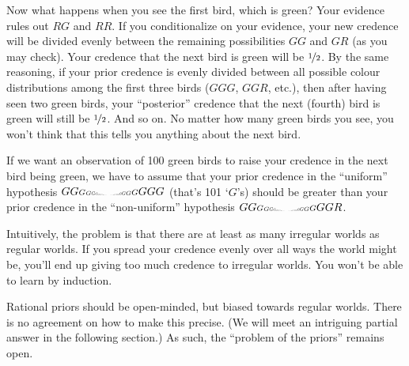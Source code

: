 Now what happens when you see the first bird, which is green? Your evidence
rules out $RG$ and $RR$. If you conditionalize on your evidence, your new
credence will be divided evenly between the remaining possibilities $GG$ and
$GR$ (as you may check). Your credence that the next bird is green will be
$\nicefrac{1}{2}$. By the same reasoning, if your prior credence is evenly
divided between all possible colour distributions among the first three birds
($GGG$, $GGR$, etc.), then after having seen two green birds, your ``posterior''
credence that the next (fourth) bird is green will still be $\nicefrac{1}{2}$. And so
on. No matter how many green birds you see, you won't think that this tells you
anything about the next bird.

If we want an observation of 100 green birds to raise your credence in the next
bird being green, we have to assume that your prior credence in the ``uniform''
hypothesis
$GG
{\scriptstyle G}
{\scriptscriptstyle G}
\scaleto{G}{3pt}
\scaleto{G}{2pt}
\scaleto{GG}{1.2pt}
\scaleto{GG}{0.8pt}
\scaleto{GG}{0.5pt}
\scaleto{GG}{0.3pt}
\scaleto{GGGGGGG}{0.2pt}
\scaleto{
  GGGGGGGGGG
  GGGGGGGGGG
  GGGGGGGGGG
}{0.1pt}
\scaleto{GGGGGGG}{0.2pt}
\scaleto{GG}{0.3pt}
\scaleto{GG}{0.5pt}
\scaleto{GG}{0.8pt}
\scaleto{GG}{1.2pt}
\scaleto{G}{2pt}
\scaleto{G}{3pt}
{\scriptscriptstyle G}{\scriptstyle G}GGG$
(that's 101 `$G$'s) should be greater than your prior
credence in the ``non-uniform'' hypothesis
$GG
{\scriptstyle G}
{\scriptscriptstyle G}
\scaleto{G}{3pt}
\scaleto{G}{2pt}
\scaleto{GG}{1.2pt}
\scaleto{GG}{0.8pt}
\scaleto{GG}{0.5pt}
\scaleto{GG}{0.3pt}
\scaleto{GGGGGGG}{0.2pt}
\scaleto{
  GGGGGGGGGG
  GGGGGGGGGG
  GGGGGGGGGG
}{0.1pt}
\scaleto{GGGGGGG}{0.2pt}
\scaleto{GG}{0.3pt}
\scaleto{GG}{0.5pt}
\scaleto{GG}{0.8pt}
\scaleto{GG}{1.2pt}
\scaleto{G}{2pt}
\scaleto{G}{3pt}
{\scriptscriptstyle G}{\scriptstyle G}GGR$.

Intuitively, the problem is that there are at least as many irregular worlds as
regular worlds. If you spread your credence evenly over all ways the world might
be, you'll end up giving too much credence to irregular worlds. You won't be
able to learn by induction.

Rational priors should be open-minded, but biased towards regular worlds. There
is no agreement on how to make this precise. (We will meet an intriguing partial
answer in the following section.) As such, the ``problem of the priors'' remains
open.


